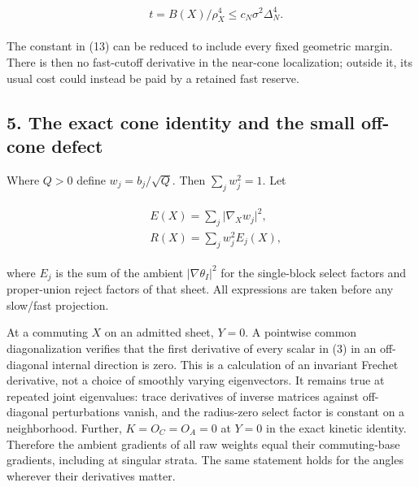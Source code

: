 \begin{gather*}
\begin{aligned}
& t=B(X)/\rho _{X}^{4} \le  c_{N} \sigma ^{2} \Delta _{N}^{4}.
\end{aligned}\tag{13}
\end{gather*}

The constant in (13) can be reduced to include every fixed geometric
margin. There is then no fast-cutoff derivative in the near-cone
localization; outside it, its usual cost could instead be paid by a
retained fast reserve.

\subsection{5. The exact cone identity and the small off-cone
defect}\label{j-the-exact-cone-identity-and-the-small-off-cone-defect}

Where \(Q>0\) define \(w_{j}=b_{j}/\sqrt{Q}\). Then
\(\sum _{j} w_{j}^{2}=1\). Let

\begin{gather*}
\begin{aligned}
& E(X)=\sum _{j} \vert \nabla _{X} w_{j}\vert ^{2}, \\
& R(X)=\sum _{j} w_{j}^{2} E_{j}(X),
\end{aligned}\tag{14}
\end{gather*}

where \(E_{j}\) is the sum of the ambient
\(\vert \nabla  \theta _{I}\vert ^{2}\) for the single-block select
factors and proper-union reject factors of that sheet. All expressions
are taken before any slow/fast projection.

At a commuting \(X\) on an admitted sheet, \(Y=0\). A pointwise common
diagonalization verifies that the first derivative of every scalar in
(3) in an off-diagonal internal direction is zero. This is a calculation
of an invariant Frechet derivative, not a choice of smoothly varying
eigenvectors. It remains true at repeated joint eigenvalues: trace
derivatives of inverse matrices against off-diagonal perturbations
vanish, and the radius-zero select factor is constant on a neighborhood.
Further, \(K=O_{C}=O_{A}=0\) at \(Y=0\) in the exact kinetic identity.
Therefore the ambient gradients of all raw weights equal their
commuting-base gradients, including at singular strata. The same
statement holds for the angles wherever their derivatives matter.

